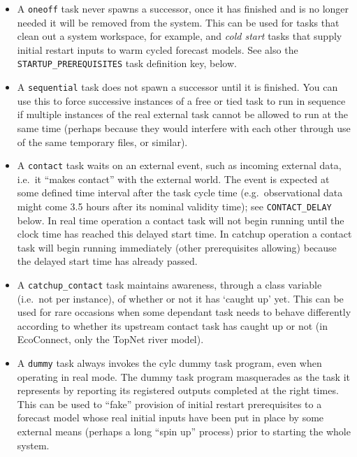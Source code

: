 \documentclass[11pt,a4paper]{article}
\begin{document}
\begin{itemize}
    \item A \lstinline=oneoff= task never spawns a successor, once it
        has finished and is no longer needed it will be removed from the
        system. This can be used for tasks that clean out a system 
        workspace, for example, and {\em cold start} tasks that supply
        initial restart inputs to warm cycled forecast models. See also
        the \lstinline=STARTUP_PREREQUISITES= task definition key, below.

    \item A \lstinline=sequential= task does not spawn a successor until it is
        finished. You can use this to force successive instances of a
        free or tied task to run in sequence if multiple instances of
        the real external task cannot be allowed to run at the same
        time (perhaps because they would interfere with each other
        through use of the same temporary files, or similar).

    \item A \lstinline=contact= task waits on an external event, such as
        incoming external data, i.e.\ it ``makes contact'' with the
        external world.  The event is expected at some defined time
        interval after the task cycle time (e.g.\ observational data
        might come 3.5 hours after its nominal validity time); see
        \lstinline=CONTACT_DELAY= below. In real time operation a contact task will
        not begin running until the clock time has reached this delayed
        start time. In catchup operation a contact task will begin
        running immediately (other prerequisites allowing) because the
        delayed start time has already passed.  
        
    \item A \lstinline=catchup_contact= task maintains awareness,
        through a class variable (i.e.\ not per instance), of whether or
        not it has `caught up' yet.  This can be used for rare occasions
        when some dependant task needs to behave differently according
        to whether its upstream contact task has caught up or not (in
        EcoConnect, only the TopNet river model).

    \item A \lstinline=dummy= task always invokes the cylc dummy task
        program, even when operating in real mode.  The dummy task
        program masquerades as the task it represents by reporting its
        registered outputs completed at the right times. This can be
        used to ``fake'' provision of initial restart prerequisites to a
        forecast model whose real initial inputs have been put in place
        by some external means (perhaps a long ``spin up'' process)
        prior to starting the whole system.

\end{itemize}
\end{document}
